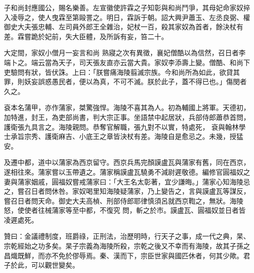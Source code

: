 \begin{pinyinscope}
 子和尚封應國公，賜名樂善。左宣徽使許霖之子知彰與和尚鬥爭，其母妃命家奴捽入凌辱之，使人曳霖至第毆詈之。明日，霖訴于朝。詔大興尹蕭玉、左丞良弼、權御史大夫張忠輔、左司員外郎王全雜治，妃杖一百，殺其家奴為首者，餘決杖有差。霖嘗跪於妃前，失大臣體，及所訴有妄，笞二十。



 大定間，家奴小僧月一妄言和尚
 熟寢之次有異徵，襄妃僧酷以為信然，召日者李端卜之。端云當為天子，司天張友直亦云當大貴。家奴李添壽上變。僧酷、和尚下吏驗問有狀，皆伏誅。上曰：「朕嘗痛海陵翦滅宗族。今和尚所為如此，欲貸其罪，則妖妄誤惑愚民者，便以為真，不可不滅。朕於此子，蓋不得已也。」傷閔者久之。



 袞本名蒲甲，亦作蒲家，桀驚強悍。海陵不喜其為人。初為輔國上將軍。天德初，加特進，封王，為吏部尚書，判大宗正事。坐語禁中起居狀，兵部侍郎蕭恭首問，護衛張九具言之。海陵親問。恭奪官解職，張九對不以實，特處死，
 袞與翰林學士承旨宗秀、護衛麻吉、小底王之章皆決杖有差。海陵自是愈忌之。未幾，授猛安。



 及遷中都，道中以蒲家為西京留守。西京兵馬完顏謨盧瓦與蒲家有舊，同在西京，遂相往來。蒲家嘗以玉帶遺之。蒲家稱謨盧瓦驍勇不減尉遲敬德。編修官圓福奴之妻與蒲家姻戚，圓福奴嘗戒蒲家曰：「大王名太彰著，宜少謙晦。」蒲家心知海陵忌之，嘗召日者問休咎。家奴喝里知海陵疑蒲家，乃上變告之，言與謨盧瓦等謀反，嘗召日者問天命。御史大夫高楨、刑部侍郎耶律慎須呂就西京鞫之，無狀。海陵怒，使使者往械蒲家等至中都，不復究
 問，斬之於市。謨盧瓦、圓福奴並日者皆凌遲處死。



 贊曰：金議禮制度，班爵祿，正刑法，治歷明時，行天子之事，成一代之典，杲、宗乾經始之功多矣。杲子宗義為海陵所殺，宗乾之後又不幸而有海陵，故其子孫之昌熾既鮮，而亦不免於僇辱焉。秦、漢而下，宗臣世家與國匹休者，何其少歟。君子於此，可以觀世變矣。



\end{pinyinscope}